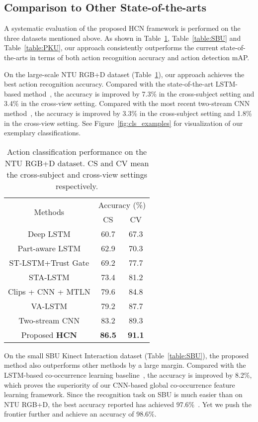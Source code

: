 \documentclass{article}
\begin{document}
\subsection{Comparison to Other State-of-the-arts}
A systematic evaluation of the proposed HCN framework is performed on the three datasets mentioned above. As shown in Table~\ref{table:NTU}, Table~\ref{table:SBU} and Table~\ref{table:PKU}, our approach consistently outperforms the current state-of-the-arts in terms of both action recognition accuracy and action detection mAP.

On the large-scale NTU RGB+D dataset (Table~\ref{table:NTU}), our approach achieves the best action recognition accuracy. Compared with the state-of-the-art LSTM-based method~\cite{view_adaptive}, the accuracy is improved by 7.3\% in the cross-subject setting and 3.4\% in the cross-view setting. Compared with the most recent two-stream CNN method~\cite{Li_2017_ICMEW}, the accuracy is improved by 3.3\% in the cross-subject setting and 1.8\% in the cross-view setting. See Figure~\ref{fig:cls_examples} for visualization of our exemplary classifications.

\begin{table}[tbp]
  \centering
  \begin{tabular}{c|cc}\hline
    \multirow{2}{*}{Methods} & \multicolumn{2}{c}{Accuracy (\%)} \\
    & CS & CV \\ \hline
    Deep LSTM \cite{NTURGBD} &60.7 &67.3 \\
    Part-aware LSTM \cite{NTURGBD}     &62.9 &70.3 \\
    ST-LSTM+Trust Gate \cite{trust_gate} &69.2 &77.7 \\
    STA-LSTM \cite{song2016end}   &73.4 &81.2 \\
    Clips + CNN + MTLN \cite{Ke_2017_CVPR}  &79.6 &84.8 \\
    VA-LSTM \cite{view_adaptive}    &79.2  &87.7 \\
    Two-stream CNN \cite{Li_2017_ICMEW} &83.2  &89.3 \\
    Proposed {\bfseries HCN}  &{\bfseries 86.5} &{\bfseries 91.1} \\
    \hline
  \end{tabular}
\caption{Action classification performance on the NTU RGB+D dataset. CS and CV mean the cross-subject and cross-view settings respectively.}
  \label{table:NTU}
\end{table}

On the small SBU Kinect Interaction dataset (Table~\ref{table:SBU}), the proposed method also outperforms other methods by a large margin. Compared with the LSTM-based co-occurrence learning baseline~\cite{co_occurrence}, the accuracy is improved by 8.2\%, which proves the superiority of our CNN-based global co-occurrence feature learning framework. Since the recognition task on SBU is much easier than on NTU RGB+D, the best accuracy reported has achieved 97.6\%~\cite{view_adaptive}. Yet we push the frontier further and achieve an accuracy of 98.6\%.
\end{document}
